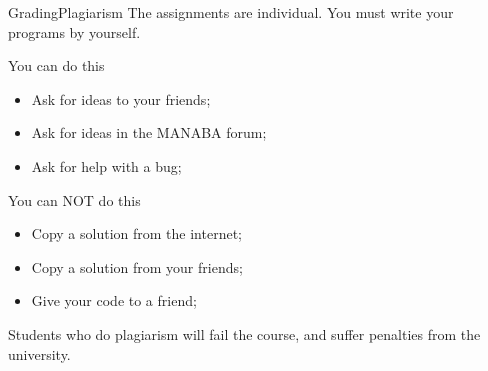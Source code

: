 \begin{frame}{Grading}{Plagiarism}
  The assignments are \alert{individual}. You must write your
  programs by yourself.

  \begin{exampleblock}{You can do this}
    \begin{itemize}
    \item Ask for ideas to your friends;
    \item Ask for ideas in the MANABA forum;
    \item Ask for help with a bug;
    \end{itemize}
  \end{exampleblock}

  \begin{alertblock}{You can NOT do this}
    \begin{itemize}
    \item Copy a solution from the internet;
    \item Copy a solution from your friends;
    \item Give your code to a friend;
    \end{itemize}
  \end{alertblock}

  Students who do plagiarism will fail the course, and suffer penalties from the university.
\end{frame}

